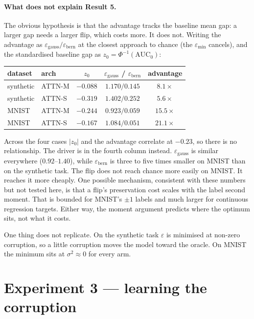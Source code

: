 \documentclass[11pt,a4paper]{article}
\newcommand{\vs}{\sigma^2}
\begin{document}
\paragraph{What does not explain Result 5.} The obvious hypothesis is that the
advantage tracks the baseline mean gap: a larger gap needs a larger flip, which
costs more. It does not. Writing the advantage as
$\varepsilon_{\text{gauss}}/\varepsilon_{\text{bern}}$ at the closest approach
to chance (the $\varepsilon_{\min}$ cancels), and the standardised baseline gap
as $z_0=\Phi^{-1}(\mathrm{AUC}_0)$:

\begin{center}\small
\begin{tabular}{llccc}
\toprule
dataset & arch & $z_0$ & $\varepsilon_{\text{gauss}}$ / $\varepsilon_{\text{bern}}$ & advantage\\
\midrule
synthetic & ATTN-M & $-0.088$ & $1.170 / 0.145$ & $8.1\times$\\
synthetic & ATTN-S & $-0.319$ & $1.402 / 0.252$ & $5.6\times$\\
MNIST     & ATTN-M & $-0.244$ & $0.923 / 0.059$ & $15.5\times$\\
MNIST     & ATTN-S & $-0.167$ & $1.084 / 0.051$ & $21.1\times$\\
\bottomrule
\end{tabular}
\end{center}

Across the four cases $|z_0|$ and the advantage correlate at $-0.23$, so there
is no relationship. The driver is in the fourth column instead.
$\varepsilon_{\text{gauss}}$ is similar everywhere ($0.92$--$1.40$), while
$\varepsilon_{\text{bern}}$ is three to five times smaller on MNIST than on the
synthetic task. The flip does not reach chance more easily on MNIST. It reaches
it more cheaply. One possible mechanism, consistent with these numbers but not
tested here, is that a flip's preservation cost scales with the label second
moment. That is bounded for MNIST's $\pm1$ labels and much larger for
continuous regression targets. Either way, the moment argument predicts where
the optimum sits, not what it costs.

One thing does not replicate. On the synthetic task $\varepsilon$ is minimised
at non-zero corruption, so a little corruption moves the model toward the
oracle. On MNIST the minimum sits at $\vs\approx0$ for every arm.

\section{Experiment 3 — learning the corruption}
\end{document}
